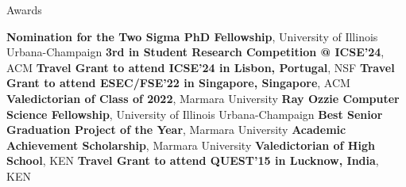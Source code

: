 \begin{rubric}{Awards}

\entry*[2024] \textbf{Nomination for the Two Sigma PhD Fellowship}, University of Illinois Urbana-Champaign
\entry*[2024] \textbf{3rd in Student Research Competition @ ICSE'24}, ACM
\entry*[2024] \textbf{Travel Grant to attend ICSE'24 in Lisbon, Portugal}, NSF
\entry*[2022] \textbf{Travel Grant to attend ESEC/FSE'22 in Singapore, Singapore}, ACM
\entry*[2022] \textbf{Valedictorian of Class of 2022}, Marmara University
\entry*[2022] \textbf{Ray Ozzie Computer Science Fellowship}, University of Illinois Urbana-Champaign
\entry*[2022] \textbf{Best Senior Graduation Project of the Year}, Marmara University
\entry*[2019] \textbf{Academic Achievement Scholarship}, Marmara University
\entry*[2017] \textbf{Valedictorian of High School}, KEN
\entry*[2015] \textbf{Travel Grant to attend QUEST'15 in Lucknow, India}, KEN

\end{rubric}